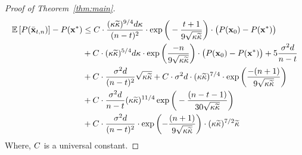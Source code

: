 \begin{proof}[Proof of Theorem~\ref{thm:main}]
\iffalse
	\begin{align*}
		\E{P(\xtilde)}-P(\xs) &\leq 10^7\cdot\frac{(\cnH\cnS)^{9/4}d}{(n-t)^2\delta}\cdot\exp\bigg(-\frac{t+1}{9\sqrt{\cnH\cnS}}\bigg)\norm{\thetat[0]}^2 +10^6\cdot\frac{(\cnH\cnS)^{5/4}d}{\delta}\exp\left(\frac{-n }{9\sqrt{\cnH\cnS}}\right) \cdot \norm{\thetat[0]}^2 + \\&5\frac{\sigma^2d}{n-t}+ 1360\cdot\frac{\sigma^2 d}{(n-t)^2} \sqrt{\cnH\cnS} + 10^6\cdot\sigma^2d\cdot(\cnH\cnS)^{7/4}\cdot\exp\bigg(\frac{-(n+1)}{9\sqrt{\cnH\cnS}}\bigg) \\ &+ 10^8\cdot\frac{\sigma^2d}{n-t}(\cnH\cnS)^{11/4}\alpha^{(n-t-1)/2} +10^{10}\cdot\frac{\sigma^2d}{(n-t)^2}\cdot\exp\bigg({-\frac{(n+1)}{9\sqrt{\cnH\cnS}}}\bigg)\cdot(\cnH\cnS)^{7/2}\cnS
	\end{align*}
	\fi
	\begin{align*}
		\mathbb{E}\left[P(\bar{\mathbf{x}}_{t,n})\right]-P(\mathbf{x}^*) &\leq C\cdot\frac{({\kappa}\widetilde{\kappa})^{9/4}d{\kappa}}{(n-t)^2}\cdot\exp\bigg(-\frac{t+1}{9\sqrt{{\kappa}\widetilde{\kappa}}}\bigg)\cdot\big(P(\mathbf{x}_0)-P(\mathbf{x}^*)\big) \\&+C\cdot({\kappa}\widetilde{\kappa})^{5/4}d{\kappa}\cdot\exp\left(\frac{-n }{9\sqrt{{\kappa}\widetilde{\kappa}}}\right) \cdot \big(P(\mathbf{x}_0)-P(\mathbf{x}^*)\big) + 5\frac{\sigma^2d}{n-t}\\&+ C\cdot\frac{\sigma^2 d}{(n-t)^2} \sqrt{{\kappa}\widetilde{\kappa}} + C\cdot\sigma^2d\cdot({\kappa}\widetilde{\kappa})^{7/4}\cdot\exp\bigg(\frac{-(n+1)}{9\sqrt{{\kappa}\widetilde{\kappa}}}\bigg) \\ &+ C\cdot\frac{\sigma^2d}{n-t}({\kappa}\widetilde{\kappa})^{11/4}\exp\bigg(-\frac{(n-t-1)}{30\sqrt{{\kappa}\widetilde{\kappa}}}\bigg) \\&+C\cdot\frac{\sigma^2d}{(n-t)^2}\cdot\exp\bigg({-\frac{(n+1)}{9\sqrt{{\kappa}\widetilde{\kappa}}}}\bigg)\cdot({\kappa}\widetilde{\kappa})^{7/2}\widetilde{\kappa}
	\end{align*}	
	Where, $C$ is a universal constant.

\end{proof}




\iffalse

